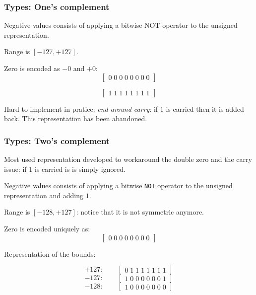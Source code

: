 \begin{frame}
  \frametitle{Types: One's complement}

\medskip
Negative values consists of applying a bitwise NOT operator to the unsigned representation.

\medskip
Range is $[-127, +127]$.

\medskip
Zero is encoded as $-0$ and $+0$:
\begin{equation*}
\begin{bmatrix}0\;0\;0\;0\;0\;0\;0\;0 \end{bmatrix}
\end{equation*}

\begin{equation*}
\begin{bmatrix}1\;1\;1\;1\;1\;1\;1\;1 \end{bmatrix}
\end{equation*}

\medskip
Hard to implement in pratice: \textit{end-around carry}: if $1$ is carried then it is added back. This representation has been abandoned.

\end{frame}

\begin{frame}
  \frametitle{Types: Two's complement}

\medskip
Most used representation developed to workaround the double zero and the carry issue: if $1$ is carried is is simply ignored.

\medskip
Negative values consists of applying a bitwise \texttt{NOT} operator to the unsigned representation and adding $1$.

\medskip
Range is $[-128, +127]$:  notice that it is not symmetric anymore.

\medskip
Zero is encoded uniquely as:
\begin{equation*}
\begin{bmatrix}0\;0\;0\;0\;0\;0\;0\;0 \end{bmatrix}
\end{equation*}

\medskip
Representation of the bounds:

\begin{equation*}
+127:\qquad\begin{bmatrix}0\;1\;1\;1\;1\;1\;1\;1 \end{bmatrix}
\end{equation*}
\begin{equation*}
-127:\qquad\begin{bmatrix}1\;0\;0\;0\;0\;0\;0\;1 \end{bmatrix}
\end{equation*}
\begin{equation*}
-128:\qquad\begin{bmatrix}1\;0\;0\;0\;0\;0\;0\;0 \end{bmatrix}
\end{equation*}

\end{frame}

